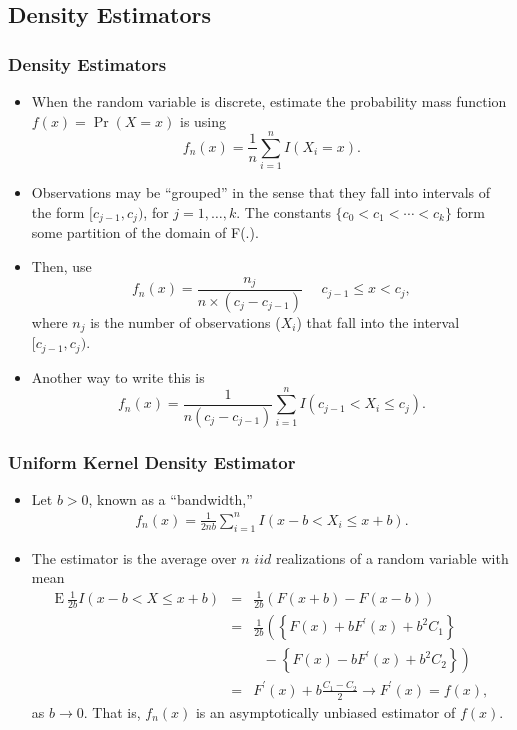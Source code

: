 \documentclass{beamer}
\begin{document}
\subsection{Density Estimators}

\begin{frame}[shrink=2]
\frametitle{Density Estimators}
\begin{itemize}
\item When the random variable is discrete, estimate the probability mass function $f(x) = \Pr(X=x)$ is using
$$ f_n(x) = \frac{1}{n} \sum_{i=1}^n I(X_i = x).$$
\item Observations may be ``grouped'' in the sense that they fall into intervals of the form $[c_{j-1}, c_j)$, for $j=1, \ldots, k$. The constants $\{c_0 < c_1 < \cdots < c_k\}$ form some partition of the domain of F(.).
 \item    Then, use
$$ f_n(x) = \frac{n_j}{n \times (c_j - c_{j-1})}  \ \ \ \ \ \ c_{j-1} \le x < c_j,$$
where $n_j$ is the number of observations ($X_i$) that fall into the interval $[c_{j-1}, c_j)$.
\item Another way to write this is
$$  f_n(x) = \frac{1}{n(c_j-c_{j-1})} \sum_{i=1}^n I(c_{j-1} < X_i \le c_j).$$
\end{itemize}
\end{frame}

\begin{frame}[shrink=2]
\frametitle{Uniform Kernel Density Estimator}
\begin{itemize}
\item Let $b>0$, known as a ``bandwidth,''
\begin{eqnarray*}
 f_n(x) = \frac{1}{2nb} \sum_{i=1}^n I(x-b < X_i \le x + b).
\end{eqnarray*}
\item The estimator is the average over $n$ $iid$ realizations of a random variable with mean
\begin{eqnarray*}
\mathrm{E~ } \frac{1}{2b} I(x-b < X \le x + b) &=& \frac{1}{2b}\left(F(x+b)-F(x-b)\right) \\
&=& \frac{1}{2b} \left( \left\{ F(x) + b F^{\prime}(x) + b^2 C_1\right\} \right.\\
&& \ \ \ -
\left. \left\{ F(x) - b F^{\prime}(x) + b^2 C_2\right\} \right) \\
&=& F^{\prime}(x) + b \frac{C_1-C_2}{2} \rightarrow  F^{\prime}(x) = f(x),
\end{eqnarray*}
as $b\rightarrow  0$. That is, $f_n(x)$ is an asymptotically unbiased estimator of $f(x)$.
\end{itemize}
\end{frame}
\end{document}

